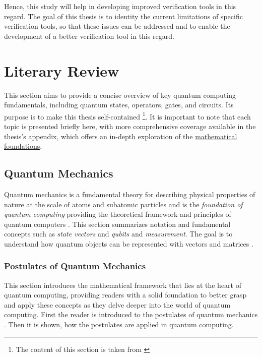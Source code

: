 \documentclass[11pt]{article}
\theoremstyle{definition}
\theoremstyle{definition}
\begin{document}
Hence, this study will help in developing improved verification tools in
this regard.
The goal of this thesis is to identity the current limitations of specific
verification tools, so that these issues can be addressed and to enable the
development of a better verification tool in this regard.

\section{Literary Review}
\label{sec:orga937c92}
This section aims to provide a concise overview of key quantum computing
fundamentals, including quantum states, operators, gates, and circuits. Its
purpose is to make this thesis self-contained \footnote{The content of this section is taken from \cite[Introduction]{burgholzer_design_2023}\label{org9d7a22d}}. It is important to note that
each topic is presented briefly here, with more comprehensive coverage
available in the thesis's appendix, which offers an in-depth exploration of
the \hyperref[sec:org9d349e2]{mathematical foundations}.


\subsection{Quantum Mechanics}
\label{sec:orgeee856c}
Quantum mechanics is a fundamental theory for describing physical properties
of nature at the scale of atoms and subatomic particles and is the
\emph{foundation of quantum computing} providing the theoretical framework and
principles of quantum computers \cite{feynman_lectures_1977}.
This section summarizes notation and fundamental concepts such as \emph{state
vectors} and \emph{qubits} and \emph{measurement}.
The goal is to understand how quantum objects can be represented with
vectors and matrices \cite{Wille_tools_2022}.


\subsubsection{Postulates of Quantum Mechanics}
\label{sec:org0e280e6}
This section introduces the mathematical framework that lies at the heart of
quantum computing, providing readers with a solid foundation to better
grasp and apply these concepts as they delve deeper into the world of
quantum computing.
First the reader is introduced to the postulates of 
quantum mechanics \cite[, Chapter 2.2]{nielsen_quantum_2010}.
Then it is shown, how the postulates are applied in quantum computing.
\end{document}
